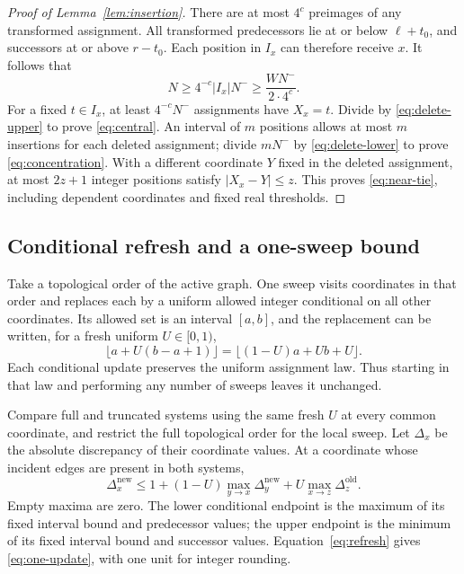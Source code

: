 \begin{proof}[Proof of Lemma~\ref{lem:insertion}]
There are at most $4^c$ preimages of any transformed assignment.
All transformed predecessors lie at or below $\ell+t_0$, and successors
at or above $r-t_0$. Each position in $I_x$ can therefore receive $x$.
It follows that
\begin{equation}
                    N\geq4^{-c}|I_x|N^-\geq \frac{WN^-}{2\cdot4^c}.
\label{eq:delete-lower}
\end{equation}
For a fixed $t\in I_x$, at least $4^{-c}N^-$ assignments have $X_x=t$.
Divide by \eqref{eq:delete-upper} to prove \eqref{eq:central}.
An interval of $m$ positions allows at most $m$ insertions for each deleted
assignment; divide $mN^-$ by \eqref{eq:delete-lower} to prove
\eqref{eq:concentration}. With a different coordinate $Y$ fixed in the
deleted assignment, at most $2z+1$ integer positions satisfy
$|X_x-Y|\leq z$. This proves \eqref{eq:near-tie}, including dependent
coordinates and fixed real thresholds.
\end{proof}

\subsection{Conditional refresh and a one-sweep bound}

Take a topological order of the active graph. One sweep visits coordinates
in that order and replaces each by a uniform allowed integer conditional
on all other coordinates. Its allowed set is an interval $[a,b]$, and the
replacement can be written, for a fresh uniform $U\in[0,1)$,
\begin{equation}
                   \lfloor a+U(b-a+1)\rfloor
                   =\lfloor(1-U)a+Ub+U\rfloor.
\label{eq:refresh}
\end{equation}
Each conditional update preserves the uniform assignment law. Thus starting
in that law and performing any number of sweeps leaves it unchanged.

Compare full and truncated systems using the same fresh $U$ at every common
coordinate, and restrict the full topological order for the local sweep.
Let $\Delta_x$ be the absolute discrepancy of their coordinate values.
At a coordinate whose incident edges are present in both systems,
\begin{equation}
\Delta_x^{\mathrm{new}}
\leq1+(1-U)\max_{y\to x}\Delta_y^{\mathrm{new}}
          +U\max_{x\to z}\Delta_z^{\mathrm{old}}.
\label{eq:one-update}
\end{equation}
Empty maxima are zero. The lower conditional endpoint is the maximum
of its fixed interval bound and predecessor values; the upper endpoint
is the minimum of its fixed interval bound and successor values.
Equation~\eqref{eq:refresh} gives \eqref{eq:one-update}, with one unit
for integer rounding.

